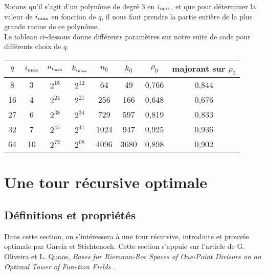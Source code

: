 \documentclass[10pt]{article}
\newcommand{\s}{\vspace{0.3cm}}
\newcommand{\ii}{i_{\rm{max}}}
\begin{document}
Notons qu'il s'agit d'un polynôme de degré 3 en $\ii$, et que pour déterminer la valeur de $\ii$ en fonction de $q$, il nous faut prendre la partie entière de la plus grande racine de ce polynôme. \\
Le tableau ci-dessous donne différents paramètres sur notre suite de code pour différents choix de $q$.

\newpage

\begin{center}
\begin{tabular}{|c|c|c|c|c|c|c|c|}
\hline
$q$ & $\ii$ & $n_{\ii}$ & $k_{\ii}$ & $n_0$ & $k_0$ & $\rho_0$ & majorant sur $\rho_0$ \\ 
\hline
8 & 3 & $2^{15}$ & $2^{12}$ & 64 & 49 & 0,766 & 0,844 \\
\hline
16 & 4 & $2^{24}$ & $2^{21}$ & 256 & 166 & 0,648 & 0,676 \\
\hline
27 & 6 & $2^{38}$ & $2^{34}$ & 729 & 597 & 0,819 & 0,833 \\
\hline
32 & 7 & $2^{45}$ & $2^{41}$ & 1024 & 947 & 0,925 & 0,936 \\
\hline
64 & 10 & $2^{72}$ & $2^{68}$ & 4096 & 3680 & 0,898 & 0,902 \\
\hline
\end{tabular}
\end{center}

\s

\section{Une tour récursive optimale}

\s

\subsection{Définitions et propriétés}

\s

Dans cette section, on s’intéressera à une tour récursive, introduite et prouvée optimale par Garcia et Stichtenoch. Cette section s'appuie sur l'article de G. Oliveira et L. Quoos, \it{Bases for Riemann-Roc Spaces of One-Point Divisors on an Optimal Tower of Function Fields} \rm.
\end{document}
